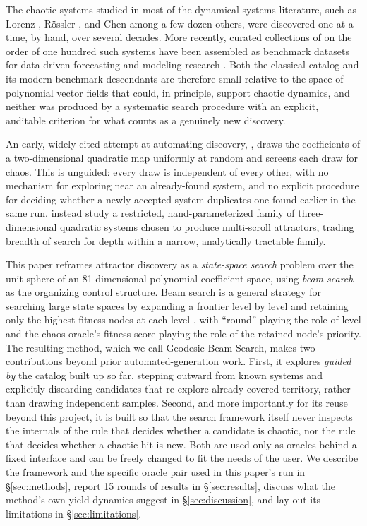 \documentclass[11pt]{article}
\begin{document}
The chaotic systems studied in most of the dynamical-systems literature,
such as Lorenz \citep{lorenz1963deterministic}, R\"ossler
\citep{rossler1976equation}, and Chen \citep{chen1999yet} among a few dozen
others, were discovered one at a time, by hand, over several decades. More recently, curated collections of on
the order of one hundred such systems have been assembled as benchmark
datasets for data-driven forecasting and modeling research
\citep{gilpin2021chaos,gilpin2023model}. Both the classical catalog and its
modern benchmark descendants are therefore small relative to the space of
polynomial vector fields that could, in principle, support chaotic dynamics,
and neither was produced by a systematic search procedure with an explicit,
auditable criterion for what counts as a genuinely new discovery.

An early, widely cited attempt at automating discovery, \citet{sprott1993automatic},
draws the coefficients of a two-dimensional quadratic map uniformly at random
and screens each draw for chaos. This is unguided: every draw is independent
of every other, with no mechanism for exploring near an already-found
system, and no explicit procedure for deciding whether a newly accepted system
duplicates one found earlier in the same run. \citet{elhadj2013simplest}
instead study a restricted, hand-parameterized family of three-dimensional
quadratic systems chosen to produce multi-scroll attractors, trading breadth of
search for depth within a narrow, analytically tractable family.

This paper reframes attractor discovery as a \emph{state-space search}
problem over the unit sphere of an 81-dimensional polynomial-coefficient
space, using \emph{beam search} as the organizing control structure. Beam
search is a general strategy for searching large state spaces by expanding
a frontier level by level and retaining only the highest-fitness nodes at
each level \citep{bisiani1987beam,lowerre1976harpy}, with ``round'' playing
the role of level and the chaos oracle's fitness score playing the role of
the retained node's priority. The resulting method, which we call Geodesic Beam Search, makes two contributions beyond prior automated-generation work. First, it explores \emph{guided by} the catalog built up so far, stepping outward from known
systems and explicitly discarding candidates that re-explore already-covered
territory, rather than drawing independent samples. Second, and more
importantly for its reuse beyond this project, it is built so that the search
framework itself never inspects the internals of the rule that decides whether
a candidate is chaotic, nor the rule that decides whether a chaotic hit is
new. Both are used only as oracles behind a fixed interface and can be freely changed to fit the needs of the user. We describe the framework and the specific oracle pair used in this paper's run in \S\ref{sec:methods}, report 15 rounds of results in \S\ref{sec:results},
discuss what the method's own yield dynamics suggest in
\S\ref{sec:discussion}, and lay out its limitations in
\S\ref{sec:limitations}.
\end{document}
